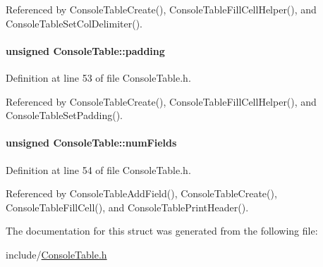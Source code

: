Referenced by ConsoleTableCreate(), ConsoleTableFillCellHelper(), and ConsoleTableSetColDelimiter().\hypertarget{structConsoleTable_1e9951fcb5c5c2899ab1df4713245946}{
\paragraph[padding]{\setlength{\rightskip}{0pt plus 5cm}unsigned {\bf ConsoleTable::padding}}\hfill}
\label{structConsoleTable_1e9951fcb5c5c2899ab1df4713245946}




Definition at line 53 of file ConsoleTable.h.

Referenced by ConsoleTableCreate(), ConsoleTableFillCellHelper(), and ConsoleTableSetPadding().\hypertarget{structConsoleTable_b82ba43aaff40eda8add81e660bbe289}{
\paragraph[numFields]{\setlength{\rightskip}{0pt plus 5cm}unsigned {\bf ConsoleTable::numFields}}\hfill}
\label{structConsoleTable_b82ba43aaff40eda8add81e660bbe289}




Definition at line 54 of file ConsoleTable.h.

Referenced by ConsoleTableAddField(), ConsoleTableCreate(), ConsoleTableFillCell(), and ConsoleTablePrintHeader().

The documentation for this struct was generated from the following file:\begin{CompactItemize}
\item 
include/\hyperlink{ConsoleTable_8h}{ConsoleTable.h}\end{CompactItemize}
